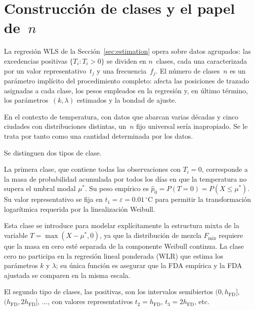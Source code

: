\documentclass[APA,STIX1COL]{WileyNJD-v2}
\begin{document}
{%
\section{Construcción de clases y el papel de~$n$}\label{sec:classes}

La regresi\'on WLS de la Secci\'on~\ref{sec:estimation} opera sobre
datos agrupados: las excedencias positivas $\{T_i:T_i>0\}$ se
dividen en $n$~clases, cada una caracterizada por un valor
representativo~$t_j$ y una frecuencia~$f_j$. El n\'umero de
clases~$n$ es un par\'ametro impl\'icito del procedimiento
completo: afecta las posiciones de trazado asignadas a cada clase,
los pesos empleados en la regresi\'on y, en \'ultimo t\'ermino,
los par\'ametros~$(k,\lambda)$ estimados y la bondad de ajuste.

En el contexto de temperatura, con datos que abarcan varias d\'ecadas y cinco
ciudades con distribuciones distintas, un~$n$ fijo universal
ser\'ia inapropiado. Se le trata por tanto como una cantidad
determinada por los datos.

Se distinguen dos tipos de clase.

La primera clase, que contiene todas las observaciones con $T_i = 0$, corresponde a la masa de probabilidad acumulada por todos los
d\'ias en que la temperatura no supera el umbral modal $\mu^*$. Su
peso emp\'irico es $\hat{p}_0 = P(T = 0) = P(X \leq \mu^*)$. Su valor representativo se fija en
$t_1=\varepsilon=0.01\,{}^\circ\mathrm{C}$ para permitir la transformaci\'on logar\'itmica requerida por la linealizaci\'on
Weibull.

Esta clase se introduce para modelar expl\'icitamente la estructura
mixta de la variable $T = \max(X - \mu^*, 0)$, ya que la distribuci\'on
de mezcla $F_{\text{mix}}$ requiere que la masa en cero est\'e separada de la componente
Weibull continua. La clase cero no participa en la regresi\'on lineal
ponderada (WLR) que estima los par\'ametros $k$ y $\lambda$; su \'unica
funci\'on es asegurar que la FDA emp\'irica y la FDA ajustada se comparen
en la misma escala.

\medskip

El segundo tipo de clases, las positivas, son los intervalos semibiertos
$(0,h_{\mathrm{FD}}]$, $(h_{\mathrm{FD}},2h_{\mathrm{FD}}]$,
$\ldots$, con valores representativos $t_2=h_{\mathrm{FD}}$,
$t_3=2h_{\mathrm{FD}}$, etc.

\medskip

}
\end{document}
